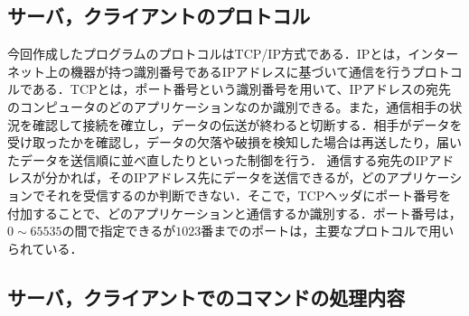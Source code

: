 \documentclass{jarticle}[11pt]
\begin{document}
\subsection{サーバ，クライアントのプロトコル}
今回作成したプログラムのプロトコルはTCP/IP方式である．IPとは，インターネット上の機器が持つ識別番号であるIPアドレスに基づいて通信を行うプロトコルである．TCPとは，ポート番号という識別番号を用いて、IPアドレスの宛先のコンピュータのどのアプリケーションなのか識別できる。また，通信相手の状況を確認して接続を確立し，データの伝送が終わると切断する．相手がデータを受け取ったかを確認し，データの欠落や破損を検知した場合は再送したり，届いたデータを送信順に並べ直したりといった制御を行う．
通信する宛先のIPアドレスが分かれば，そのIPアドレス先にデータを送信できるが，どのアプリケーションでそれを受信するのか判断できない．そこで，TCPヘッダにポート番号を付加することで、どのアプリケーションと通信するか識別する．ポート番号は，$0\sim65535$の間で指定できるが$1023$番までのポートは，主要なプロトコルで用いられている． 


\subsection{サーバ，クライアントでのコマンドの処理内容}
\end{document}
